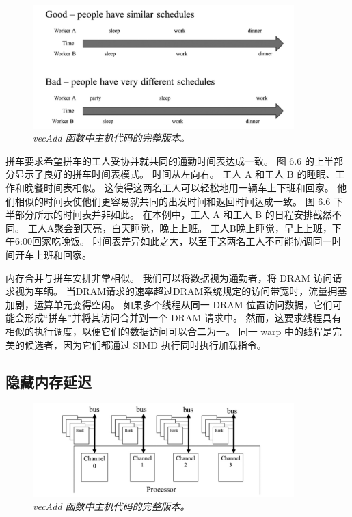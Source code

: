 \begin{figure}[H]
	\centering
	\includegraphics[width=0.9\textwidth]{figs/F6.6.png}
	\caption{\textit{\color{red} vecAdd 函数中主机代码的完整版本。}}
\end{figure}

拼车要求希望拼车的工人妥协并就共同的通勤时间表达成一致。 图 6.6 的上半部分显示了良好的拼车时间表模式。 
时间从左向右。 工人 A 和工人 B 的睡眠、工作和晚餐时间表相似。 这使得这两名工人可以轻松地用一辆车上下班和回家。 
他们相似的时间表使他们更容易就共同的出发时间和返回时间达成一致。 图 6.6 下半部分所示的时间表并非如此。 
在本例中，工人 A 和工人 B 的日程安排截然不同。 工人A聚会到天亮，白天睡觉，晚上上班。 
工人B晚上睡觉，早上上班，下午6:00回家吃晚饭。 时间表差异如此之大，以至于这两名工人不可能协调同一时间开车上班和回家。

内存合并与拼车安排非常相似。 我们可以将数据视为通勤者，将 DRAM 访问请求视为车辆。 
当DRAM请求的速率超过DRAM系统规定的访问带宽时，流量拥塞加剧，运算单元变得空闲。 
如果多个线程从同一 DRAM 位置访问数据，它们可能会形成“拼车”并将其访问合并到一个 DRAM 请求中。 
然而，这要求线程具有相似的执行调度，以便它们的数据访问可以合二为一。 
同一 warp 中的线程是完美的候选者，因为它们都通过 SIMD 执行同时执行加载指令。

\subsection{隐藏内存延迟}
\begin{figure}[H]
	\centering
	\includegraphics[width=0.9\textwidth]{figs/F6.7.png}
	\caption{\textit{\color{red} vecAdd 函数中主机代码的完整版本。}}
\end{figure}

